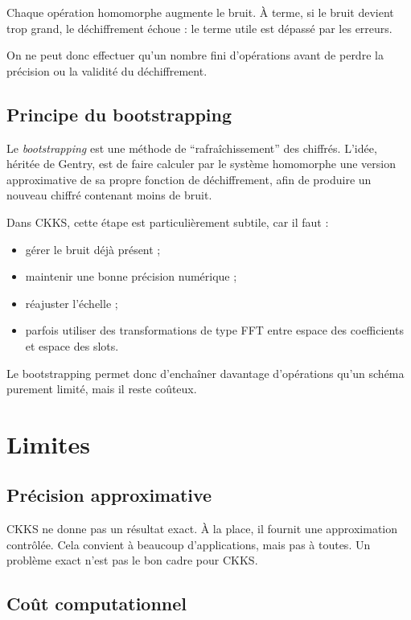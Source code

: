 \documentclass[11pt,a4paper]{article}
\begin{document}
Chaque opération homomorphe augmente le bruit. À terme, si le bruit devient trop grand, le déchiffrement échoue : le terme utile est dépassé par les erreurs.

On ne peut donc effectuer qu'un nombre fini d'opérations avant de perdre la précision ou la validité du déchiffrement.

\subsection{Principe du bootstrapping}

Le \emph{bootstrapping} est une méthode de ``rafraîchissement'' des chiffrés. L'idée, héritée de Gentry, est de faire calculer par le système homomorphe une version approximative de sa propre fonction de déchiffrement, afin de produire un nouveau chiffré contenant moins de bruit.

Dans CKKS, cette étape est particulièrement subtile, car il faut :
\begin{itemize}[leftmargin=2em]
  \item gérer le bruit déjà présent ;
  \item maintenir une bonne précision numérique ;
  \item réajuster l'échelle ;
  \item parfois utiliser des transformations de type FFT entre espace des coefficients et espace des slots.
\end{itemize}

Le bootstrapping permet donc d'enchaîner davantage d'opérations qu'un schéma purement limité, mais il reste coûteux.

\section{Limites}

\subsection{Précision approximative}

CKKS ne donne pas un résultat exact. À la place, il fournit une approximation contrôlée. Cela convient à beaucoup d'applications, mais pas à toutes. Un problème exact n'est pas le bon cadre pour CKKS.

\subsection{Coût computationnel}
\end{document}
